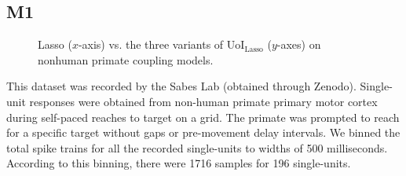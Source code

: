 \documentclass[11pt]{article}
\begin{document}
\subsection{M1}
\begin{figure}
	\vspace{-25pt}
	\centering
	\caption{Lasso ($x$-axis) vs. the three variants of UoI$_{\text{Lasso}}$ ($y$-axes) on nonhuman primate coupling models.}
	\label{fig:nhp}
\end{figure}
This dataset was recorded by the Sabes Lab (obtained through Zenodo). Single-unit responses were obtained from non-human primate primary motor cortex during self-paced reaches to target on a grid. The primate was prompted to reach for a specific target without gaps or pre-movement delay intervals. We binned the total spike trains for all the recorded single-units to widths of 500 milliseconds. According to this binning, there were 1716 samples for 196 single-units.
\end{document}
